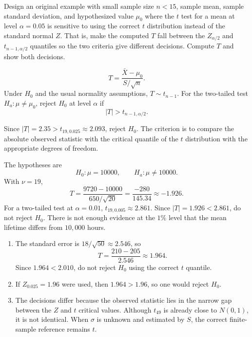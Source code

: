 \begin{problema}\label{prob:cb4980c}
Design an original example with small sample size $n<15$, sample mean, sample standard deviation, and hypothesized value $\mu_0$ where the $t$ test for a mean at level $\alpha=0.05$ is sensitive to using the correct $t$ distribution instead of the standard normal $Z$. That is, make the computed $T$ fall between the $Z_{\alpha/2}$ and $t_{n-1,\alpha/2}$ quantiles so the two criteria give different decisions. Compute $T$ and show both decisions.
\end{problema}

\begin{solproblema}[prob:b3d462b]
\[
	T=\frac{\bar X-\mu_0}{S/\sqrt n}.
\]
Under $H_0$ and the usual normality assumptions, $T\sim t_{n-1}$. For the two-tailed test $H_a:\mu\ne\mu_0$, reject $H_0$ at level $\alpha$ if
\[
	|T|>t_{n-1,\alpha/2}.
\]
\end{solproblema}

\begin{solproblema}[prob:313cd70]
Since $|T|=2.35>t_{19,0.025}\approx2.093$, reject $H_0$. The criterion is to compare the absolute observed statistic with the critical quantile of the $t$ distribution with the appropriate degrees of freedom.
\end{solproblema}

\begin{solproblema}[prob:50f5282]
The hypotheses are
\[
	H_0:\mu=10000,\qquad H_a:\mu\ne10000.
\]
With $\nu=19$,
\[
	T=\frac{9720-10000}{650/\sqrt{20}}
	=\frac{-280}{145.34}\approx-1.926.
\]
For a two-tailed test at $\alpha=0.01$, $t_{19,0.005}\approx2.861$. Since $|T|=1.926<2.861$, do not reject $H_0$. There is not enough evidence at the $1\%$ level that the mean lifetime differs from $10{,}000$ hours.
\end{solproblema}

\begin{solproblema}[prob:8d10618]
\begin{enumerate}[label=(\alph*)]
	\item The standard error is $18/\sqrt{50}\approx2.546$, so
	\[
		T=\frac{210-205}{2.546}\approx1.964.
	\]
	Since $1.964<2.010$, do not reject $H_0$ using the correct $t$ quantile.
	\item If $Z_{0.025}=1.96$ were used, then $1.964>1.96$, so one would reject $H_0$.
	\item The decisions differ because the observed statistic lies in the narrow gap between the $Z$ and $t$ critical values. Although $t_{49}$ is already close to $N(0,1)$, it is not identical. When $\sigma$ is unknown and estimated by $S$, the correct finite-sample reference remains $t$.
\end{enumerate}
\end{solproblema}

